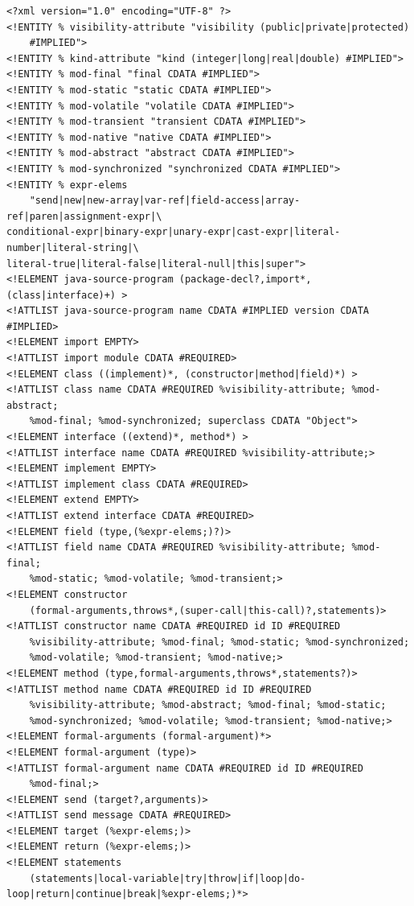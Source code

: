 \documentclass{article}
\begin{document}
{\small
\begin{verbatim}
<?xml version="1.0" encoding="UTF-8" ?>
<!ENTITY % visibility-attribute "visibility (public|private|protected)
    #IMPLIED">
<!ENTITY % kind-attribute "kind (integer|long|real|double) #IMPLIED">
<!ENTITY % mod-final "final CDATA #IMPLIED">
<!ENTITY % mod-static "static CDATA #IMPLIED">
<!ENTITY % mod-volatile "volatile CDATA #IMPLIED">
<!ENTITY % mod-transient "transient CDATA #IMPLIED">
<!ENTITY % mod-native "native CDATA #IMPLIED">
<!ENTITY % mod-abstract "abstract CDATA #IMPLIED">
<!ENTITY % mod-synchronized "synchronized CDATA #IMPLIED">
<!ENTITY % expr-elems
    "send|new|new-array|var-ref|field-access|array-ref|paren|assignment-expr|\
conditional-expr|binary-expr|unary-expr|cast-expr|literal-number|literal-string|\
literal-true|literal-false|literal-null|this|super">
<!ELEMENT java-source-program (package-decl?,import*,(class|interface)+) >
<!ATTLIST java-source-program name CDATA #IMPLIED version CDATA #IMPLIED>
<!ELEMENT import EMPTY>
<!ATTLIST import module CDATA #REQUIRED>
<!ELEMENT class ((implement)*, (constructor|method|field)*) >
<!ATTLIST class name CDATA #REQUIRED %visibility-attribute; %mod-abstract;
    %mod-final; %mod-synchronized; superclass CDATA "Object">
<!ELEMENT interface ((extend)*, method*) >
<!ATTLIST interface name CDATA #REQUIRED %visibility-attribute;>
<!ELEMENT implement EMPTY>
<!ATTLIST implement class CDATA #REQUIRED>
<!ELEMENT extend EMPTY>
<!ATTLIST extend interface CDATA #REQUIRED>
<!ELEMENT field (type,(%expr-elems;)?)>
<!ATTLIST field name CDATA #REQUIRED %visibility-attribute; %mod-final;
    %mod-static; %mod-volatile; %mod-transient;>
<!ELEMENT constructor
    (formal-arguments,throws*,(super-call|this-call)?,statements)>
<!ATTLIST constructor name CDATA #REQUIRED id ID #REQUIRED
    %visibility-attribute; %mod-final; %mod-static; %mod-synchronized;
    %mod-volatile; %mod-transient; %mod-native;>
<!ELEMENT method (type,formal-arguments,throws*,statements?)>
<!ATTLIST method name CDATA #REQUIRED id ID #REQUIRED
    %visibility-attribute; %mod-abstract; %mod-final; %mod-static;
    %mod-synchronized; %mod-volatile; %mod-transient; %mod-native;>
<!ELEMENT formal-arguments (formal-argument)*>
<!ELEMENT formal-argument (type)>
<!ATTLIST formal-argument name CDATA #REQUIRED id ID #REQUIRED
    %mod-final;>
<!ELEMENT send (target?,arguments)>
<!ATTLIST send message CDATA #REQUIRED>
<!ELEMENT target (%expr-elems;)>
<!ELEMENT return (%expr-elems;)>
<!ELEMENT statements
    (statements|local-variable|try|throw|if|loop|do-loop|return|continue|break|%expr-elems;)*>

\end{verbatim}}
\end{document}
